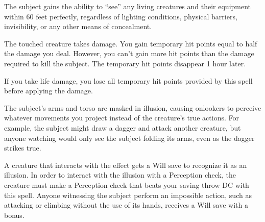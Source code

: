 \begin{spelleffect}
  The subject gains the ability to ``see'' any living creatures and their equipment within 60 feet perfectly, regardless of lighting conditions, physical barriers, invisibility, or any other means of concealment.
\end{spelleffect}

\begin{spelleffect}
  The touched creature takes damage. You gain temporary hit points equal to half the damage you deal. However, you can't gain more hit points than the damage required to kill the subject. The temporary hit points disappear 1 hour later.

  If you take life damage, you lose all temporary hit points provided by this spell before applying the damage.
\end{spelleffect}

\spellrng{\rngclose}
\spelldur{\durshort}
\begin{spelleffect}
  The subject's arms and torso are masked in illusion, causing onlookers to perceive whatever movements you project instead of the creature's true actions. For example, the subject might draw a dagger and attack another creature, but anyone watching would only see the subject folding its arms, even as the dagger strikes true.
\end{spelleffect}
\begin{spellnotes}
  A creature that interacts with the effect gets a Will save to recognize it as an illusion. In order to interact with the illusion with a Perception check, the creature must make a Perception check that beats your saving throw DC with this spell. Anyone witnessing the subject perform an impossible action, such as attacking or climbing without the use of its hands, receives a Will save with a  bonus.
\end{spellnotes}


